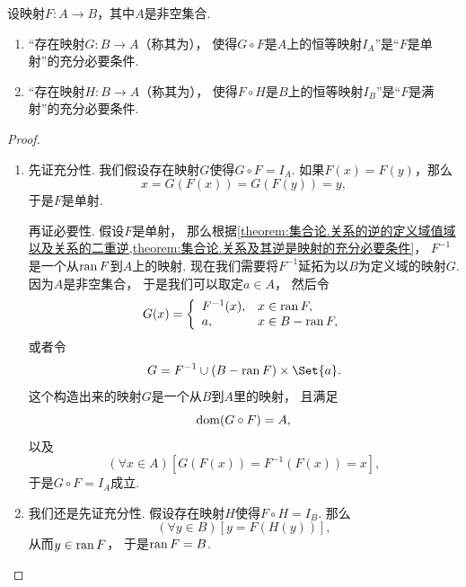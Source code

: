 \begin{theorem}
设映射\(F\colon A \to B\)，其中\(A\)是非空集合.
\begin{enumerate}
	\item “存在映射\(G\colon B \to A\)（称其为），
	使得\(G \circ F\)是\(A\)上的恒等映射\(I_A\)”是“\(F\)是单射”的充分必要条件.

	\item “存在映射\(H\colon B \to A\)（称其为），
	使得\(F \circ H\)是\(B\)上的恒等映射\(I_B\)”是“\(F\)是满射”的充分必要条件.
\end{enumerate}
\begin{proof}
\begin{enumerate}
	\item
	先证充分性.
	我们假设存在映射\(G\)使得\(G \circ F = I_A\).
	如果\(F(x) = F(y)\)，那么\begin{equation*}
		x = G(F(x)) = G(F(y)) = y,
	\end{equation*}
	于是\(F\)是单射.

	再证必要性.
	假设\(F\)是单射，
	那么根据\cref{theorem:集合论.关系的逆的定义域值域以及关系的二重逆,theorem:集合论.关系及其逆是映射的充分必要条件}，
	\(F^{-1}\)是一个从\(\operatorname{ran} F\)到\(A\)上的映射.
	现在我们需要将\(F^{-1}\)延拓为以\(B\)为定义域的映射\(G\).
	因为\(A\)是非空集合，
	于是我们可以取定\(a \in A\)，
	然后令\begin{equation*}
		G(x) = \left\{ \begin{array}{ll}
			F^{-1}(x), & x \in \operatorname{ran} F, \\
			a, & x \in B - \operatorname{ran} F,
		\end{array} \right.
	\end{equation*}或者令\begin{equation*}
		G = F^{-1} \cup (B - \ran F) \times \Set{a}.
	\end{equation*}
	这个构造出来的映射\(G\)是一个从\(B\)到\(A\)里的映射，
	且满足\begin{equation*}
		\operatorname{dom}(G \circ F) = A,
	\end{equation*}
	以及\begin{equation*}
		(\forall x \in A)[G(F(x)) = F^{-1}(F(x)) = x],
	\end{equation*}
	于是\(G \circ F = I_A\)成立.

	\item
	我们还是先证充分性.
	假设存在映射\(H\)使得\(F \circ H = I_B\).
	那么\begin{equation*}
		(\forall y \in B)[y = F(H(y))],
	\end{equation*}
	从而\(y \in \operatorname{ran} F\)，
	于是\(\operatorname{ran} F = B\).


\end{enumerate}
\end{proof}
\end{theorem}
